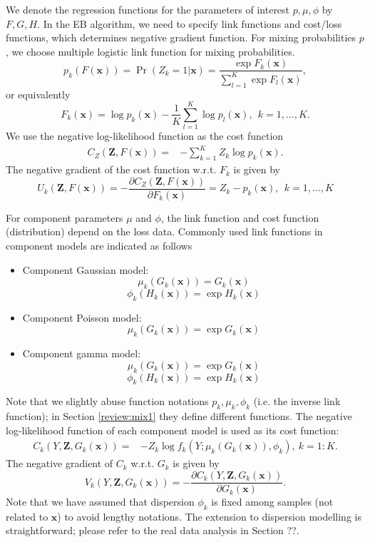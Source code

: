\documentclass[11pt]{article}
\numberwithin{equation}{section}
\def\bx{\boldsymbol{x}}
\def\bZ{\boldsymbol{Z}}
\begin{document}
We denote the regression functions for the parameters of interest $p,\mu,\phi$ by {$F,G,H$}. In the EB algorithm, we need to specify link functions and cost/loss functions, which determines negative gradient function.
For mixing probabilities $p$, we choose multiple logistic link function for mixing probabilities.	
	\begin{equation}\label{logistic}
		p_k(F(\bx))=\Pr(Z_k=1|\bx)=\frac{\exp{F_k(\bx)}}{\sum_{l=1}^{K}\exp{F_l(\bx)}},
	\end{equation}
	or equivalently
	\begin{equation}\label{inv-logistic}
		F_k(\bx)=\log p_k(\bx)-\frac{1}{K}\sum_{l=1}^K\log p_l(\bx),~~k=1,\ldots,K.
	\end{equation}
We use the negative log-likelihood function as the cost function
\begin{equation}
	\begin{aligned}
		{C_{Z}(\bZ, F(\bx))}=& - \sum_{k=1}^K Z_k \log p_k(\bx).
	\end{aligned}
\end{equation}
The negative gradient of the cost function w.r.t. $F_k$ is given by
\begin{equation}
	{U_k(\bZ,F(\bx))}=-\frac{\partial C_{Z}(\bZ,F(\bx))}{\partial F_k(\bx)}=
	Z_k-p_k(\bx), ~~k=1,\ldots,K
\end{equation}

For component parameters $\mu$ and $\phi$, the link function and cost function (distribution) depend on the loss data.
Commonly used link functions in component models are indicated as follows
	\begin{itemize}
		\item Component Gaussian model:
		$$\mu_k(G_k(\bx))=G_k(\bx)$$
		$$\phi_k(H_k(\bx))=\exp H_k(\bx)$$
		\item Component Poisson model:
		$$\mu_k(G_k(\bx))=\exp G_k(\bx)$$
		\item Component gamma model:
		$$\mu_k(G_k(\bx))=\exp G_k(\bx)$$
		$$\phi_k(H_k(\bx))=\exp H_k(\bx)$$
	\end{itemize}
Note that we slightly abuse function notations $p_k,\mu_k,\phi_k$ (i.e. the inverse link function); in Section \eqref{review:mix1} they define different functions.
The negative log-likelihood function of each component model is used as its cost function:
	\begin{equation}
		\begin{aligned}
			{C_k(Y,\bZ,G_k(\bx))}=& -Z_k\log f_k(Y;\mu_k(G_k(\bx)),\phi_k), ~ k=1:K.
		\end{aligned}
	\end{equation}
	The negative gradient of $C_k$ w.r.t. $G_k$ is given by 
	$${V_k(Y,\bZ,G_k(\bx))}=-\frac{\partial C_k(Y,\bZ,G_k(\bx))}{\partial G_k(\bx)}.$$
	Note that we have assumed that dispersion $\phi_k$ is fixed among samples (not related to $\bx$) to avoid lengthy notations. The extension to dispersion modelling is straightforward; please refer to the real data analysis in Section ??.
\end{document}
